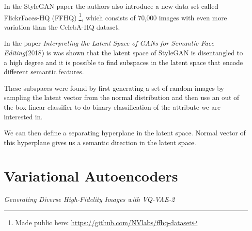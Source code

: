 In the StyleGAN paper the authors also introduce a new data set called FlickrFaces-HQ (FFHQ) \footnote{Made public here: \url{https://github.com/NVlabs/ffhq-dataset}}, which consists of 70,000 images with even more variation than the CelebA-HQ dataset.\cite{stylegan}


In the paper \textit{Interpreting the Latent Space of GANs for Semantic Face Editing}(2018)\cite{interfacegan} is was shown that the latent space of StyleGAN is disentangled to a high degree and it is possible to find subspaces in the latent space that encode different semantic features.

These subspaces were found by first generating a set of random images by sampling the latent vector from the normal distribution and then use an out of the box linear classifier to do binary classification of the attribute we are interested in.

We can then define a separating hyperplane in the latent space. Normal vector of this hyperplane gives us a semantic direction in the latent space.


\section{Variational Autoencoders}

\textit{Generating Diverse High-Fidelity Images with VQ-VAE-2}\cite{vqvae2}
